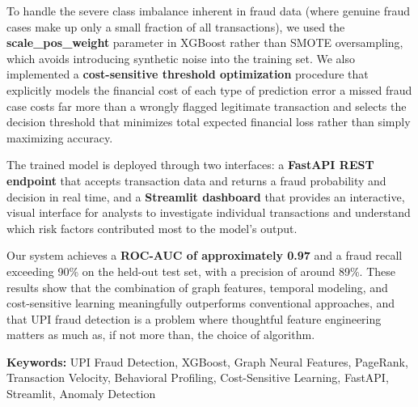 \noindent To handle the severe class imbalance inherent in fraud data (where genuine fraud cases make up only a small fraction of all transactions), we used the \textbf{scale\_pos\_weight} parameter in XGBoost rather than SMOTE oversampling, which avoids introducing synthetic noise into the training set. We also implemented a \textbf{cost-sensitive threshold optimization} procedure that explicitly models the financial cost of each type of prediction error a missed fraud case costs far more than a wrongly flagged legitimate transaction and selects the decision threshold that minimizes total expected financial loss rather than simply maximizing accuracy.

\vspace{0.2in}

\noindent The trained model is deployed through two interfaces: a \textbf{FastAPI REST endpoint} that accepts transaction data and returns a fraud probability and decision in real time, and a \textbf{Streamlit dashboard} that provides an interactive, visual interface for analysts to investigate individual transactions and understand which risk factors contributed most to the model's output.

\vspace{0.2in}

\noindent Our system achieves a \textbf{ROC-AUC of approximately 0.97} and a fraud recall exceeding 90\% on the held-out test set, with a precision of around 89\%. These results show that the combination of graph features, temporal modeling, and cost-sensitive learning meaningfully outperforms conventional approaches, and that UPI fraud detection is a problem where thoughtful feature engineering matters as much as, if not more than, the choice of algorithm.

\vspace{0.3in}

\noindent\textbf{Keywords:} UPI Fraud Detection, XGBoost, Graph Neural Features, PageRank, Transaction Velocity, Behavioral Profiling, Cost-Sensitive Learning, FastAPI, Streamlit, Anomaly Detection
